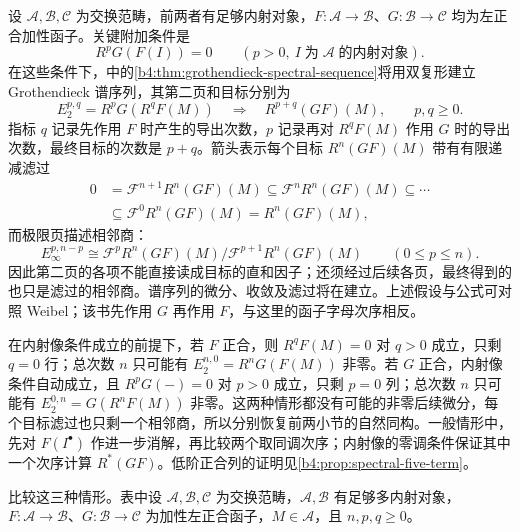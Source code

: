 设 \(\mathcal A,\mathcal B,\mathcal C\) 为交换范畴，前两者有足够内射对象，\(F:\mathcal A\to\mathcal B\)、\(G:\mathcal B\to\mathcal C\) 均为左正合加性函子。关键附加条件是
\[
	R^pG(F(I))=0\qquad(p>0,\ I\;\text{为}\;\mathcal A\;\text{的内射对象}).
\]
在这些条件下，中的\cref{b4:thm:grothendieck-spectral-sequence}将用双复形建立 Grothendieck 谱序列，其第二页和目标分别为
\[
	E_2^{p,q}=R^pG(R^qF(M)) \quad\Longrightarrow\quad R^{p+q}(GF)(M),\qquad p,q\ge0.
\]
指标 \(q\) 记录先作用 \(F\) 时产生的导出次数，\(p\) 记录再对 \(R^qF(M)\) 作用 \(G\) 时的导出次数，最终目标的次数是 \(p+q\)。箭头表示每个目标 \(R^n(GF)(M)\) 带有有限递减滤过
\[
	\begin{aligned}
		0&=\mathcal F^{n+1}R^n(GF)(M)\subseteq\mathcal F^nR^n(GF)(M)\subseteq\cdots\\
		&\subseteq\mathcal F^0R^n(GF)(M)=R^n(GF)(M),
	\end{aligned}
\]
而极限页描述相邻商：
\[
	E_\infty^{p,n-p}\cong \mathcal F^pR^n(GF)(M)/\mathcal F^{p+1}R^n(GF)(M) \qquad(0\le p\le n).
\]
因此第二页的各项不能直接读成目标的直和因子；还须经过后续各页，最终得到的也只是滤过的相邻商。谱序列的微分、收敛及滤过将在建立。上述假设与公式可对照 Weibel\cite[Cohomological Setup 5.8.1, Grothendieck Spectral Sequence Theorem 5.8.3]{Weibel1994HomologicalAlgebra}；该书先作用 \(G\) 再作用 \(F\)，与这里的函子字母次序相反。

\ProseParagraphBreak
在内射像条件成立的前提下，若 \(F\) 正合，则 \(R^qF(M)=0\) 对 \(q>0\) 成立，只剩 \(q=0\) 行；总次数 \(n\) 只可能有 \(E_2^{n,0}=R^nG(F(M))\) 非零。若 \(G\) 正合，内射像条件自动成立，且 \(R^pG(-)=0\) 对 \(p>0\) 成立，只剩 \(p=0\) 列；总次数 \(n\) 只可能有 \(E_2^{0,n}=G(R^nF(M))\) 非零。这两种情形都没有可能的非零后续微分，每个目标滤过也只剩一个相邻商，所以分别恢复前两小节的自然同构。一般情形中，先对 \(F(I^\bullet)\) 作进一步消解，再比较两个取同调次序；内射像的零调条件保证其中一个次序计算 \(R^*(GF)\)。低阶正合列的证明见\cref{b4:prop:spectral-five-term}。

\ProseParagraphBreak
{}比较这三种情形。表中设 \(\mathcal A,\mathcal B,\mathcal C\) 为交换范畴，\(\mathcal A,\mathcal B\) 有足够多内射对象，\(F:\mathcal A\to\mathcal B\)、\(G:\mathcal B\to\mathcal C\) 为加性左正合函子，\(M\in\mathcal A\)，且 \(n,p,q\ge0\)。


